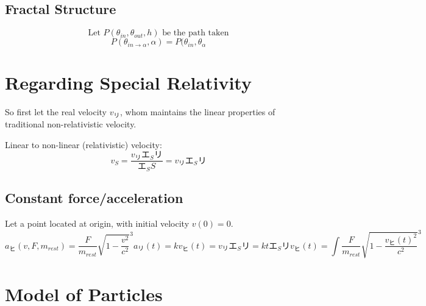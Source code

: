 \documentclass[preprint]{ptephy_v1}%
\newcommand{\jp}[1]{#1}
\newcommand{\jp}[1]{\text{#1}}
\begin{document}
\subsection{Fractal Structure}
\begin{equation}
    \text{Let }P(\theta_{in}, \theta_{out}, h)\text{ be the path taken}
\end{equation}
\begin{equation}
    P(\theta_{in\to\alpha}, \alpha)=P(\theta_{in}, \theta_{\alpha}
\end{equation}


\newpage
\section{Regarding Special Relativity}
So first let the real velocity \(v_リ\), whom maintains the linear properties of traditional non-relativistic velocity.


Linear to non-linear (relativistic) velocity:
\begin{equation}
    v_S=\frac{v_\jp{リ}\jp{エ}_S\jp{リ}}{\jp{エ}_SS}=v_\jp{リ}\jp{エ}_S\jp{リ}
\end{equation}

\subsection{Constant force/acceleration}
Let a point located at origin, with initial velocity $v(0)=0$.
\begin{subequations}
    \begin{equation}
        a_\jp{ヒ}(v, F, m_{rest})=\frac{F}{m_{rest}}\sqrt{1-\frac{v^2}{c^2}}^3
    \end{equation}
    \begin{equation}
        a_\jp{リ}(t)=k
    \end{equation}
    \begin{equation}
        v_\jp{ヒ}(t)=v_\jp{リ}\jp{エ}_S\jp{リ}=kt\jp{エ}_S\jp{リ}
    \end{equation}
    \begin{equation}
        v_\jp{ヒ}(t)=\int \frac{F}{m_{rest}}\sqrt{1-\frac{v_\jp{ヒ}(t)^2}{c^2}}^3
    \end{equation}
\end{subequations}


\section{Model of Particles}
\end{document}
